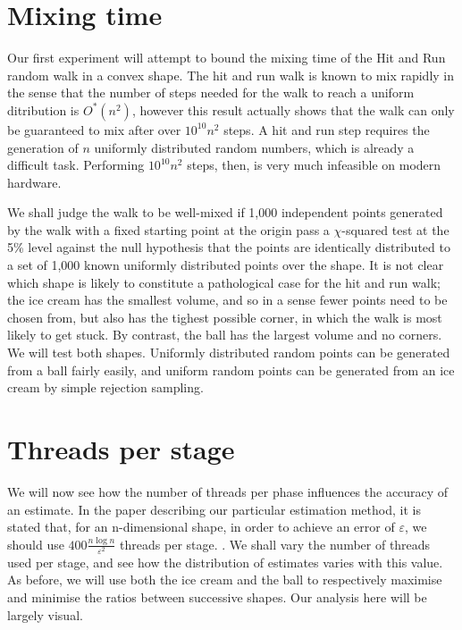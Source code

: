 \section{Mixing time}\label{sec_mix}

Our first experiment will attempt to bound the mixing time of the Hit and Run random walk in a convex shape. The hit and run walk is known to mix rapidly %
in the sense that the number of steps needed for the walk to reach a uniform ditribution is $O^{*}(n^2)$, however this result actually shows that the walk can only be guaranteed to mix after over $10^{10} n^2$
steps. A hit and run step requires the generation of $n$ uniformly distributed random numbers, which is already a difficult task. Performing $10^{10} n^2$ steps, then, is very much infeasible on modern hardware.

We shall judge the walk to be well-mixed if 1,000 independent points generated by the walk with a fixed starting point at the origin pass a $\chi$-squared test at the 5\% level against the null hypothesis that the points are identically distributed to a set of 1,000 known uniformly distributed points over the shape. It is not clear which shape is likely to constitute a pathological case for the hit and run walk; the ice cream has the smallest volume, and so in a sense fewer points need to be chosen from, but also has the tighest possible corner, in which the walk is most likely to get stuck. By contrast, the ball has the largest volume and no corners. We will test both shapes. Uniformly distributed random points can be generated from a ball fairly easily, and uniform random points can be generated from an ice cream by simple rejection sampling.

\section{Threads per stage}\label{sec_error}

We will now see how the number of threads per phase influences the accuracy of an estimate. In the paper describing our particular estimation method, it is stated that, for an n-dimensional shape, in order to achieve an error of $\varepsilon$, we should use $400\frac{n\log n}{\varepsilon^2}$ threads per stage. . We shall vary the number of threads used per stage, and see how the distribution of estimates varies with this value. As before, we will use both the ice cream and the ball to respectively maximise and minimise the ratios between successive shapes. Our analysis here will be largely visual.